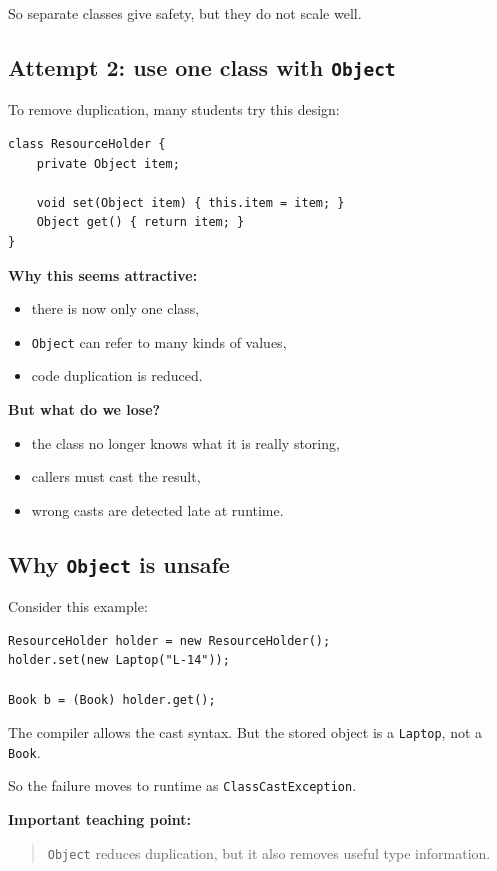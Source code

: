 \documentclass[11pt]{article}
\begin{document}
So separate classes give safety, but they do not scale well.

\subsection{Attempt 2: use one class with \texttt{Object}}
To remove duplication, many students try this design:
\begin{lstlisting}
class ResourceHolder {
    private Object item;

    void set(Object item) { this.item = item; }
    Object get() { return item; }
}
\end{lstlisting}

\textbf{Why this seems attractive:}
\begin{itemize}
  \item there is now only one class,
  \item \texttt{Object} can refer to many kinds of values,
  \item code duplication is reduced.
\end{itemize}

\textbf{But what do we lose?}
\begin{itemize}
  \item the class no longer knows what it is really storing,
  \item callers must cast the result,
  \item wrong casts are detected late at runtime.
\end{itemize}

\subsection{Why \texttt{Object} is unsafe}
Consider this example:
\begin{lstlisting}
ResourceHolder holder = new ResourceHolder();
holder.set(new Laptop("L-14"));

Book b = (Book) holder.get();
\end{lstlisting}

The compiler allows the cast syntax.
But the stored object is a \texttt{Laptop}, not a \texttt{Book}.

So the failure moves to runtime as \texttt{ClassCastException}.

\textbf{Important teaching point:}
\begin{quote}
\texttt{Object} reduces duplication, but it also removes useful type information.
\end{quote}
\end{document}
